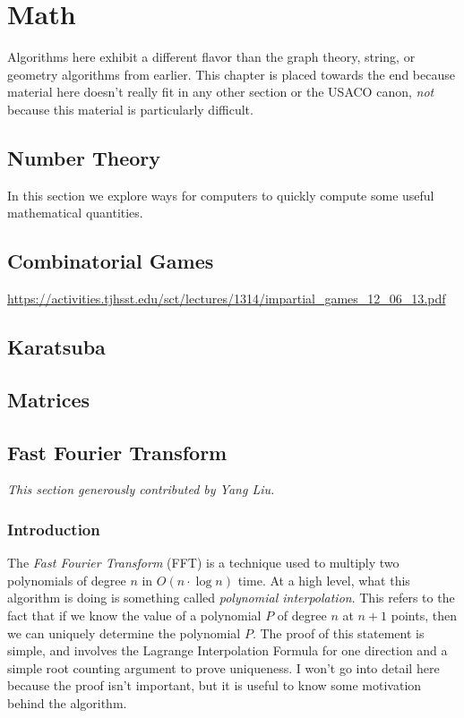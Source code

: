 \chapter{Math}

Algorithms here exhibit a different flavor than the graph theory, string, or geometry algorithms from earlier. This chapter is placed towards the end because material here doesn't really fit in any other section or the USACO canon, \textit{not} because this material is particularly difficult.

\section{Number Theory}

In this section we explore ways for computers to quickly compute some useful mathematical quantities.

\section{Combinatorial Games}

\url{https://activities.tjhsst.edu/sct/lectures/1314/impartial_games_12_06_13.pdf}

\section{Karatsuba}

\section{Matrices}

\section{Fast Fourier Transform}

\textit{This section generously contributed by Yang Liu.}

\subsection{Introduction}

The \emph{Fast Fourier Transform} (FFT) is a technique used to multiply two polynomials of degree $n$ in $O(n \cdot \log n)$ time. At a high level, what this algorithm is doing is something called \emph{polynomial interpolation}. This refers to the fact that if we know the value of a polynomial $P$ of degree $n$ at $n+1$ points, then we can uniquely determine the polynomial $P.$ The proof of this statement is simple, and involves the Lagrange Interpolation Formula for one direction and a simple root counting argument to prove uniqueness. I won't go into detail here because the proof isn't important, but it is useful to know some motivation behind the algorithm.

